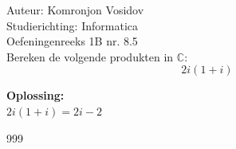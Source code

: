 \documentclass[a4paper]{article}
\begin{document}
	
	\noindent \large Auteur: Komronjon Vosidov \\
	\noindent \large Studierichting: Informatica\\
	\noindent \large Oefeningenreeks 1B nr. 8.5\\
	
	
	
	\normalsize
	Bereken de volgende produkten in $\mathbb{C}$:
	\begin{equation*}
		2i(1+i)
	\end{equation*}
	
	
	\textbf{Oplossing:}\\
	
	$2i(1+i)=2i-2$ \\	
	
	
	\begin{thebibliography}{999}
		
	\end{thebibliography}	
	
	
\end{document}
